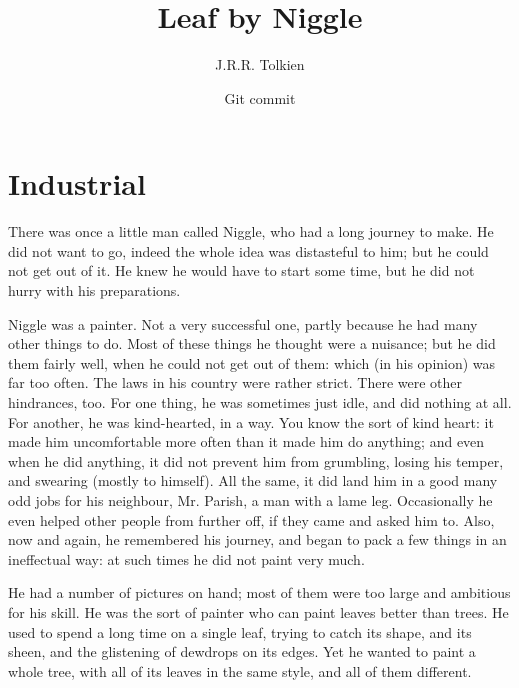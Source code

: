 \documentclass[english]{scrartcl}
\begin{document}
\title{Leaf by Niggle}
\author{J.R.R. Tolkien}
\date{Git commit \gitFirstTagDescribe}
\maketitle

\section*{Industrial}

There was once a little man called Niggle, who had a long journey to make. He did not want to go, indeed the whole idea was distasteful to him; but he could not get out of it. He knew he would have to start some time, but he did not hurry with his preparations.

Niggle was a painter. Not a very successful one, partly because he had many other things to do. Most of these things he thought were a nuisance; but he did them fairly well, when he could not get out of them: which (in his opinion) was far too often. The laws in his country were rather strict. There were other hindrances, too. For one thing, he was sometimes just idle, and did nothing at all. For another, he was kind-hearted, in a way. You know the sort of kind heart: it made him uncomfortable more often than it made him do anything; and even when he did anything, it did not prevent him from grumbling, losing his temper, and swearing (mostly to himself). All the same, it did land him in a good many odd jobs for his neighbour, Mr. Parish, a man with a lame leg. Occasionally he even helped other people from further off, if they came and asked him to. Also, now and again, he remembered his journey, and began to pack a few things in an ineffectual way: at such times he did not paint very much.

He had a number of pictures on hand; most of them were too large and ambitious for his skill. He was the sort of painter who can paint leaves better than trees. He used to spend a long time on a single leaf, trying to catch its shape, and its sheen, and the glistening of dewdrops on its edges. Yet he wanted to paint a whole tree, with all of its leaves in the same style, and all of them different.
\end{document}
